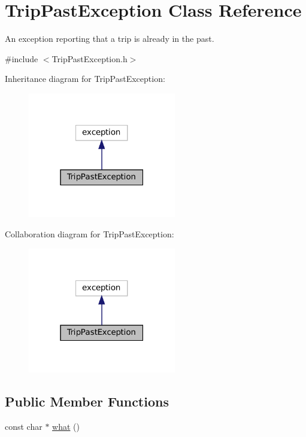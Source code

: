 \hypertarget{classTripPastException}{}\section{Trip\+Past\+Exception Class Reference}
\label{classTripPastException}


An exception reporting that a trip is already in the past.  




{\ttfamily \#include $<$Trip\+Past\+Exception.\+h$>$}



Inheritance diagram for Trip\+Past\+Exception\+:
\nopagebreak
\begin{figure}[H]
\begin{center}
\leavevmode
\includegraphics[width=183pt]{classTripPastException__inherit__graph}
\end{center}
\end{figure}


Collaboration diagram for Trip\+Past\+Exception\+:
\nopagebreak
\begin{figure}[H]
\begin{center}
\leavevmode
\includegraphics[width=183pt]{classTripPastException__coll__graph}
\end{center}
\end{figure}
\subsection*{Public Member Functions}
\begin{DoxyCompactItemize}
\item 
const char $\ast$ \mbox{\hyperlink{classTripPastException_a917f7042145fb1cbc2d43efb9f43f3f6}{what}} ()
\end{DoxyCompactItemize}


